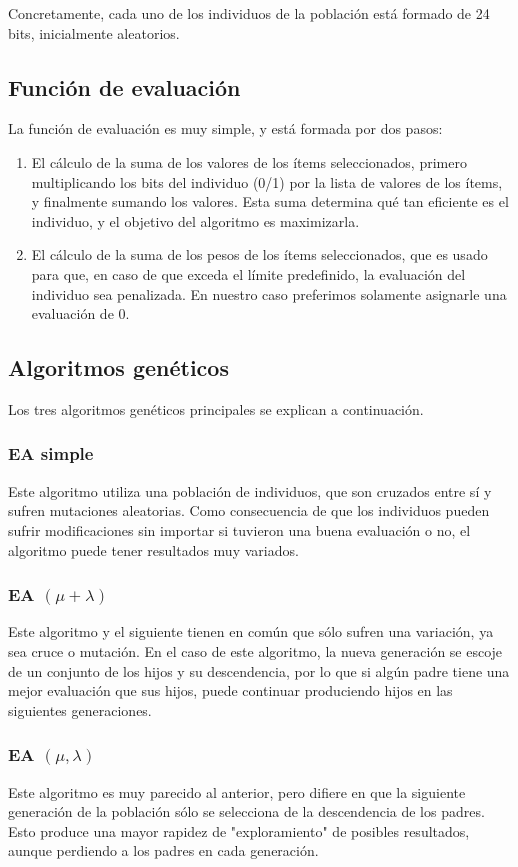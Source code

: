 \documentclass[sigconf,authorversion,nonacm]{acmart}
\begin{document}
Concretamente, cada uno de los individuos de la población está formado de 24 bits, inicialmente aleatorios.

\subsection{Función de evaluación}
La función de evaluación es muy simple, y está formada por dos pasos:
\begin{enumerate}
  \item El cálculo de la suma de los valores de los ítems seleccionados, primero multiplicando los bits del individuo (0/1) por la lista de valores de los ítems, y finalmente sumando los valores. Esta suma determina qué tan eficiente es el individuo, y el objetivo del algoritmo es maximizarla.
  \item El cálculo de la suma de los pesos de los ítems seleccionados, que es usado para que, en caso de que exceda el límite predefinido, la evaluación del individuo sea penalizada. En nuestro caso preferimos solamente asignarle una evaluación de 0.
\end{enumerate}

\subsection{Algoritmos genéticos}
Los tres algoritmos genéticos principales se explican a continuación.

\subsubsection{EA simple}
Este algoritmo utiliza una población de individuos, que son cruzados entre sí y sufren mutaciones aleatorias. Como consecuencia de que los individuos pueden sufrir modificaciones sin importar si tuvieron una buena evaluación o no, el algoritmo puede tener resultados muy variados.

\subsubsection{EA $(\mu + \lambda)$}
Este algoritmo y el siguiente tienen en común que sólo sufren una variación, ya sea cruce o mutación. En el caso de este algoritmo, la nueva generación se escoje de un conjunto de los hijos y su descendencia, por lo que si algún padre tiene una mejor evaluación que sus hijos, puede continuar produciendo hijos en las siguientes generaciones.

\subsubsection{EA $(\mu , \lambda)$}
Este algoritmo es muy parecido al anterior, pero difiere en que la siguiente generación de la población sólo se selecciona de la descendencia de los padres. Esto produce una mayor rapidez de "exploramiento" de posibles resultados, aunque perdiendo a los padres en cada generación.
\end{document}
